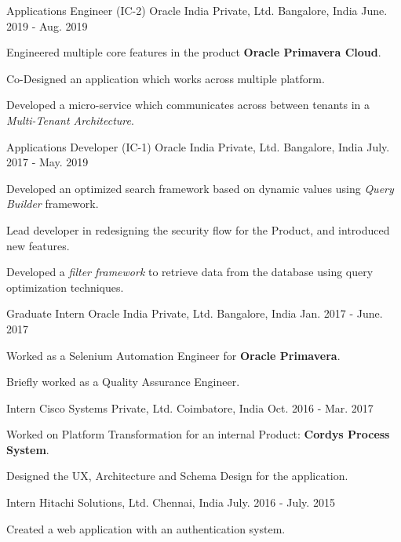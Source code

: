 \begin{cventries}
  \cventry
    {Applications Engineer (IC-2)}
    {Oracle India Private, Ltd.}
    {Bangalore, India}
    {June. 2019 - Aug. 2019}
    {
      \begin{cvitems}
        \item {Engineered multiple core features in the product \textbf{Oracle Primavera Cloud}.}
        \item {Co-Designed an application which works across multiple platform.}
        \item {Developed a micro-service which communicates across between tenants in a \textit{Multi-Tenant Architecture}.}
      \end{cvitems}
    }
  \cventry
    {Applications Developer (IC-1)}
    {Oracle India Private, Ltd.}
    {Bangalore, India}
    {July. 2017 - May. 2019}
    {
      \begin{cvitems}
        \item {Developed an optimized search framework based on dynamic values using \textit{Query Builder} framework.}
        \item {Lead developer in redesigning the security flow for the Product, and introduced new features.}
        \item {Developed a \textit{filter framework} to retrieve data from the database using query optimization techniques.}
      \end{cvitems}
    }
  \cventry
    {Graduate Intern}
    {Oracle India Private, Ltd.}
    {Bangalore, India}
    {Jan. 2017 - June. 2017}
    {
      \begin{cvitems}
        \item {Worked as a Selenium Automation Engineer for \textbf{Oracle Primavera}.}
        \item {Briefly worked as a Quality Assurance Engineer.}
      \end{cvitems}
    }
  \cventry
    {Intern}
    {Cisco Systems Private, Ltd.}
    {Coimbatore, India}
    {Oct. 2016 - Mar. 2017}
    {
      \begin{cvitems}
        \item {Worked on Platform Transformation for an internal Product: \textbf{Cordys Process System}.}
        \item {Designed the UX, Architecture and Schema Design for the application.}
      \end{cvitems} 
    }
  \cventry
    {Intern}
    {Hitachi Solutions, Ltd.}
    {Chennai, India}
    {July. 2016 - July. 2015}
    {
      \begin{cvitems}
        \item {Created a web application with an authentication system.}    
      \end{cvitems}
    }
\end{cventries}
